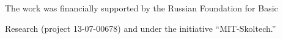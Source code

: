 








\Ack

\noindent

The work was financially supported by the Russian Foundation for Basic

Research (project 13-07-00678) and under the initiative ``MIT-Skoltech.''





\renewcommand{\bibname}{\protect\rmfamily References}




